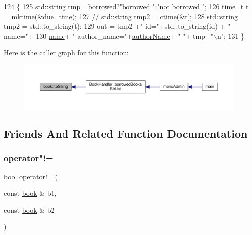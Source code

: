 \begin{DoxyCode}
124                                    \{
125      std::string tmp= \hyperlink{classbook_ab745520ed537e69bde6f2e3d7a103276}{borrowed}?\textcolor{stringliteral}{"borrowed "}:\textcolor{stringliteral}{"not borrowed "};
126      time\_t t = mktime(&\hyperlink{classbook_abf72d9a32cdadee632df5a626dbe33b8}{due\_time});
127 \textcolor{comment}{//   std::string tmp2 = ctime(&t);}
128      std::string tmp2 = std::to\_string(t);
129      out = tmp2 +\textcolor{stringliteral}{" id="}+std::to\_string(\textcolor{keywordtype}{id}) + \textcolor{stringliteral}{" name="}+
130             \hyperlink{classbook_a5eabc1c1c5abff26997bec3d41f90d9e}{name}+ \textcolor{stringliteral}{" author\_name="}+\hyperlink{classbook_a21b2962c6227818732db27f12121b732}{authorName}+ \textcolor{stringliteral}{" "}+ tmp+\textcolor{stringliteral}{"\(\backslash\)n"};
131 \}
\end{DoxyCode}
Here is the caller graph for this function\+:
\nopagebreak
\begin{figure}[H]
\begin{center}
\leavevmode
\includegraphics[width=350pt]{classbook_a458d26a8ddd01f69083a68eb68bf2181_icgraph}
\end{center}
\end{figure}


\subsection{Friends And Related Function Documentation}
\mbox{\label{classbook_af7856e28b06865a9691d5c7a330633a4}} 
\subsubsection{\texorpdfstring{operator"!=}{operator!=}}
{\footnotesize\ttfamily bool operator!= (\begin{DoxyParamCaption}\item[{const \hyperlink{classbook}{book} \&}]{b1,  }\item[{const \hyperlink{classbook}{book} \&}]{b2 }\end{DoxyParamCaption})\hspace{0.3cm}{\ttfamily [friend]}}

